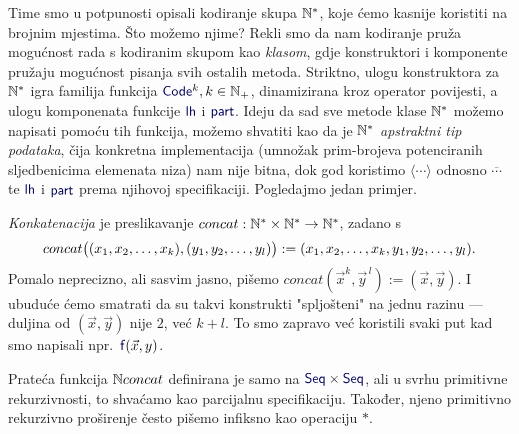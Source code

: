 Time smo u potpunosti opisali kodiranje skupa ${\mathbb N}^*$, koje ćemo kasnije koristiti na brojnim mjestima. Što možemo njime? Rekli smo da nam kodiranje pruža mogućnost rada s kodiranim skupom kao \emph{klasom}, gdje konstruktori i komponente pružaju mo\-guć\-nost pisanja svih ostalih metoda. Striktno, ulogu konstruktora za ${\mathbb N}^*$ igra familija funkcija $\f{Code}^k,k\in\N_+$, dinamizirana kroz operator povijesti, a ulogu komponenata funkcije $\f{lh}$ i $\f{part}$. Ideju da sad sve metode klase ${\mathbb N}^*$ možemo napisati pomoću tih funkcija, možemo shvatiti kao da je ${\mathbb N}^*$\! \emph{apstraktni tip podataka}, čija konkretna implementacija (umnožak prim-brojeva potenciranih sljedbenicima elemenata niza) nam nije bitna, dok god koristimo $\langle\cdots\rangle$ odnosno $\overline{\cdots}$ te $\f{lh}$ i $\f{part}$ prema njihovoj specifikaciji. Pogledajmo jedan primjer.

\begin{primjer}[{name=[konkatenacija konačnih nizova]}]\label{pr:concat}
\emph{Konkatenacija} je preslikavanje  $concat:{\mathbb N}^*\times{\mathbb N}^*\to{\mathbb N}^*$, zadano s
\begin{equation}
    concat\bigl((x_1,x_2,\dotsc,x_k),(y_1,y_2,\dotsc,y_l)\bigr):=(x_1,x_2,\dotsc,x_k,y_1,y_2,\dotsc,y_l)\text.
\end{equation}
Pomalo neprecizno, ali sasvim jasno, pišemo $concat(\vec x^k,\vec y^{\,l}):=(\vec x,\vec y)$. I ubuduće ćemo smatrati da su takvi konstrukti "spljošteni" na jednu razinu --- duljina od $(\vec x,\vec y)$ nije $2$, već $k+l$. To smo zapravo već koristili svaki put kad smo napisali npr.\ $\f{f}(\vec x,y)$.
\end{primjer}

Prateća funkcija ${\mathbb N} concat$ definirana je samo na $\f{Seq}\times\f{Seq}$, ali u svrhu primitivne rekurzivnosti, to shvaćamo kao parcijalnu specifikaciju. Također, njeno primitivno rekurzivno proširenje često pišemo infiksno kao operaciju $*$.

